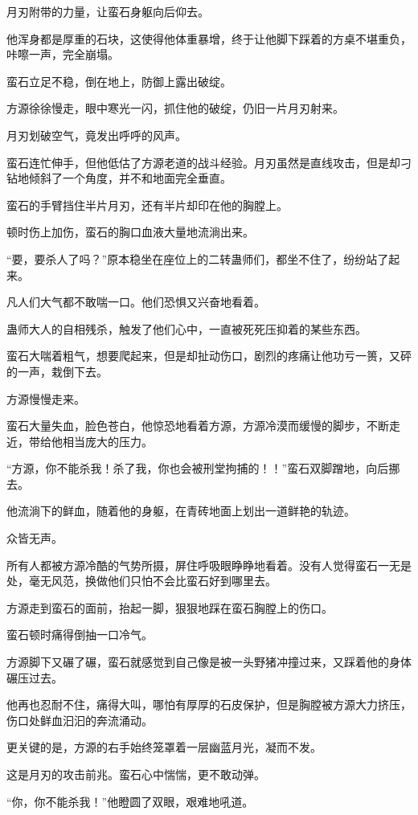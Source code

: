 \begin{this_body}
月刃附带的力量，让蛮石身躯向后仰去。

他浑身都是厚重的石块，这使得他体重暴增，终于让他脚下踩着的方桌不堪重负，咔嚓一声，完全崩塌。

蛮石立足不稳，倒在地上，防御上露出破绽。

方源徐徐慢走，眼中寒光一闪，抓住他的破绽，仍旧一片月刃射来。

月刃划破空气，竟发出呼呼的风声。

蛮石连忙伸手，但他低估了方源老道的战斗经验。月刃虽然是直线攻击，但是却刁钻地倾斜了一个角度，并不和地面完全垂直。

蛮石的手臂挡住半片月刃，还有半片却印在他的胸膛上。

顿时伤上加伤，蛮石的胸口血液大量地流淌出来。

“要，要杀人了吗？”原本稳坐在座位上的二转蛊师们，都坐不住了，纷纷站了起来。

凡人们大气都不敢喘一口。他们恐惧又兴奋地看着。

蛊师大人的自相残杀，触发了他们心中，一直被死死压抑着的某些东西。

蛮石大喘着粗气，想要爬起来，但是却扯动伤口，剧烈的疼痛让他功亏一篑，又砰的一声，栽倒下去。

方源慢慢走来。

蛮石大量失血，脸色苍白，他惊恐地看着方源，方源冷漠而缓慢的脚步，不断走近，带给他相当庞大的压力。

“方源，你不能杀我！杀了我，你也会被刑堂拘捕的！！”蛮石双脚蹭地，向后挪去。

他流淌下的鲜血，随着他的身躯，在青砖地面上划出一道鲜艳的轨迹。

众皆无声。

所有人都被方源冷酷的气势所摄，屏住呼吸眼睁睁地看着。没有人觉得蛮石一无是处，毫无风范，换做他们只怕不会比蛮石好到哪里去。

方源走到蛮石的面前，抬起一脚，狠狠地踩在蛮石胸膛上的伤口。

蛮石顿时痛得倒抽一口冷气。

方源脚下又碾了碾，蛮石就感觉到自己像是被一头野猪冲撞过来，又踩着他的身体碾压过去。

他再也忍耐不住，痛得大叫，哪怕有厚厚的石皮保护，但是胸膛被方源大力挤压，伤口处鲜血汩汩的奔流涌动。

更关键的是，方源的右手始终笼罩着一层幽蓝月光，凝而不发。

这是月刃的攻击前兆。蛮石心中惴惴，更不敢动弹。

“你，你不能杀我！”他瞪圆了双眼，艰难地吼道。


\end{this_body}
